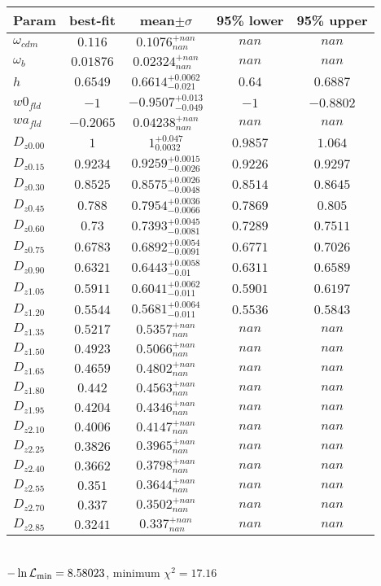 \begin{tabular}{|l|c|c|c|c|} 
 \hline 
Param & best-fit & mean$\pm\sigma$ & 95\% lower & 95\% upper \\ \hline 
$\omega_{cdm }$ &$0.116$ & $0.1076_{nan}^{+nan}$ & $nan$ & $nan$ \\ 
$\omega_{b }$ &$0.01876$ & $0.02324_{nan}^{+nan}$ & $nan$ & $nan$ \\ 
$h$ &$0.6549$ & $0.6614_{-0.021}^{+0.0062}$ & $0.64$ & $0.6887$ \\ 
$w0_{fld }$ &$-1$ & $-0.9507_{-0.049}^{+0.013}$ & $-1$ & $-0.8802$ \\ 
$wa_{fld }$ &$-0.2065$ & $0.04238_{nan}^{+nan}$ & $nan$ & $nan$ \\ 
$D_{z0.00 }$ &$1$ & $1_{0.0032}^{+0.047}$ & $0.9857$ & $1.064$ \\ 
$D_{z0.15 }$ &$0.9234$ & $0.9259_{-0.0026}^{+0.0015}$ & $0.9226$ & $0.9297$ \\ 
$D_{z0.30 }$ &$0.8525$ & $0.8575_{-0.0048}^{+0.0026}$ & $0.8514$ & $0.8645$ \\ 
$D_{z0.45 }$ &$0.788$ & $0.7954_{-0.0066}^{+0.0036}$ & $0.7869$ & $0.805$ \\ 
$D_{z0.60 }$ &$0.73$ & $0.7393_{-0.0081}^{+0.0045}$ & $0.7289$ & $0.7511$ \\ 
$D_{z0.75 }$ &$0.6783$ & $0.6892_{-0.0091}^{+0.0054}$ & $0.6771$ & $0.7026$ \\ 
$D_{z0.90 }$ &$0.6321$ & $0.6443_{-0.01}^{+0.0058}$ & $0.6311$ & $0.6589$ \\ 
$D_{z1.05 }$ &$0.5911$ & $0.6041_{-0.011}^{+0.0062}$ & $0.5901$ & $0.6197$ \\ 
$D_{z1.20 }$ &$0.5544$ & $0.5681_{-0.011}^{+0.0064}$ & $0.5536$ & $0.5843$ \\ 
$D_{z1.35 }$ &$0.5217$ & $0.5357_{nan}^{+nan}$ & $nan$ & $nan$ \\ 
$D_{z1.50 }$ &$0.4923$ & $0.5066_{nan}^{+nan}$ & $nan$ & $nan$ \\ 
$D_{z1.65 }$ &$0.4659$ & $0.4802_{nan}^{+nan}$ & $nan$ & $nan$ \\ 
$D_{z1.80 }$ &$0.442$ & $0.4563_{nan}^{+nan}$ & $nan$ & $nan$ \\ 
$D_{z1.95 }$ &$0.4204$ & $0.4346_{nan}^{+nan}$ & $nan$ & $nan$ \\ 
$D_{z2.10 }$ &$0.4006$ & $0.4147_{nan}^{+nan}$ & $nan$ & $nan$ \\ 
$D_{z2.25 }$ &$0.3826$ & $0.3965_{nan}^{+nan}$ & $nan$ & $nan$ \\ 
$D_{z2.40 }$ &$0.3662$ & $0.3798_{nan}^{+nan}$ & $nan$ & $nan$ \\ 
$D_{z2.55 }$ &$0.351$ & $0.3644_{nan}^{+nan}$ & $nan$ & $nan$ \\ 
$D_{z2.70 }$ &$0.337$ & $0.3502_{nan}^{+nan}$ & $nan$ & $nan$ \\ 
$D_{z2.85 }$ &$0.3241$ & $0.337_{nan}^{+nan}$ & $nan$ & $nan$ \\ 
\hline 
 \end{tabular} \\ 
$-\ln{\cal L}_\mathrm{min} =8.58023$, minimum $\chi^2=17.16$ \\ 
